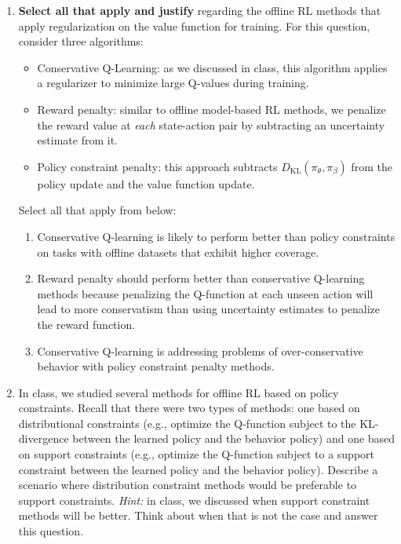 \documentclass[11pt]{article}
\begin{document}
\begin{enumerate}[label=(\roman*)]
  \item \textbf{Select all that apply and justify} regarding the offline RL methods that apply regularization on the value function for training. For this question, consider three algorithms:
  \begin{itemize}
    \item Conservative Q-Learning: as we discussed in class, this algorithm applies a regularizer to minimize large Q-values during training.
    \item Reward penalty: similar to offline model-based RL methods, we penalize the reward value at \emph{each} state-action pair by subtracting an uncertainty estimate from it.
    \item Policy constraint penalty: this approach subtracts $D_\mathrm{KL}(\pi_\theta, \pi_\beta)$ from the policy update and the value function update.
  \end{itemize}
  Select all that apply from below:
  \begin{enumerate}[label=\arabic*.]
    \item Conservative Q-learning is likely to perform better than policy constraints on tasks with offline datasets that exhibit higher coverage.
    \item Reward penalty should perform better than conservative Q-learning methods because penalizing the Q-function at each unseen action will lead to more conservatism than using uncertainty estimates to penalize the reward function.
    \item Conservative Q-learning is addressing problems of over-conservative behavior with policy constraint penalty methods.
  \end{enumerate}

  \item In class, we studied several methods for offline RL based on policy constraints. Recall that there were two types of methods: one based on distributional constraints (e.g., optimize the Q-function subject to the KL-divergence between the learned policy and the behavior policy) and one based on support constraints (e.g., optimize the Q-function subject to a support constraint between the learned policy and the behavior policy). Describe a scenario where distribution constraint methods would be preferable to support constraints. \textit{Hint:} in class, we discussed when support constraint methods will be better. Think about when that is not the case and answer this question.


\end{enumerate}
\end{document}
